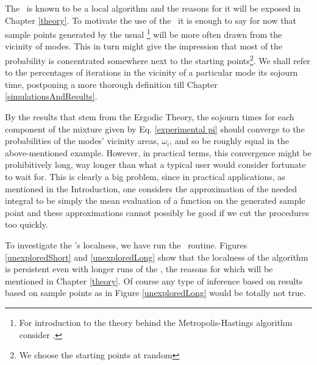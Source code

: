 The \MH\, is known to be a local algorithm and the reasons for it will be exposed in Chapter \ref{theory}. To motivate the use of the \PT\, it is enough to say for now that sample points generated by the usual \MHalgo\footnote{For introduction to the theory behind the Metropolis-Hastings algorithm consider \citet{CharlesJ.Geyer}.} will be more often drawn from the vicinity of modes. This in turn might give the impression that most of the probability is concentrated somewhere next to the starting points\footnote{We choose the starting points at random}. We shall refer to the percentages of iterations in the vicinity of a particular mode its sojourn time, postponing a more thorough definition till Chapter \ref{simulationsAndResults}. 

By the results that stem from the Ergodic Theory, the sojourn times for each component of the mixture given by Eq. \ref{experimental pi} should converge to the probabilities of the modes' vicinity areas, $\omega_i$, and so be roughly equal in the above-mentioned example. However, in practical terms, this convergence might be prohibitively long, way longer than what a typical user would consider fortunate to wait for. This is clearly a big problem, since in practical applications, as mentioned in the Introduction, one considers the approximation of the needed integral to be simply the mean evaluation of a function on the generated sample point and these approximations cannot possibly be good if we cut the procedures too quickly. 

To investigate the \MHalgo's localness, we have run the \Metro\, routine. Figures \ref{unexploredShort} and \ref{unexploredLong} show that the localness of the algorithm is persistent even with longer runs of the \MH, the reasons for which will be mentioned in Chapter \ref{theory}. Of course any type of inference based on results based on sample points as in Figure \ref{unexploredLong} would be totally not true.  

